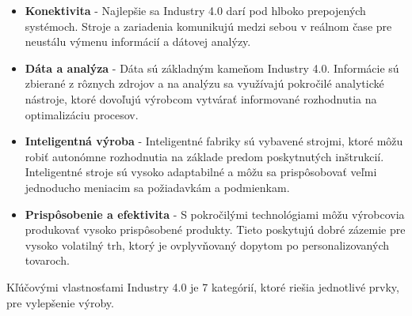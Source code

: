 \begin{itemize}
    \item \textbf{Konektivita} - Najlepšie sa Industry 4.0 darí pod hlboko prepojených systémoch. Stroje a zariadenia komunikujú medzi sebou v reálnom čase pre neustálu výmenu informácií a dátovej analýzy.
    
    \item \textbf{Dáta a analýza} - Dáta sú základným kameňom Industry 4.0. Informácie sú zbierané z rôznych zdrojov a na analýzu sa využívajú pokročilé analytické nástroje, ktoré dovoľujú výrobcom vytvárať informované rozhodnutia na optimalizáciu procesov.
    
    \item \textbf{Inteligentná výroba} - Inteligentné fabriky sú vybavené strojmi, ktoré môžu robiť autonómne rozhodnutia na základe predom poskytnutých inštrukcií. Inteligentné stroje sú vysoko adaptabilné a môžu sa prispôsobovať veľmi jednoducho meniacim sa požiadavkám a podmienkam.
    
    \item \textbf{Prispôsobenie a efektivita} - S pokročilými technológiami môžu výrobcovia produkovať vysoko prispôsobené produkty. Tieto poskytujú dobré zázemie pre vysoko volatilný trh, ktorý je ovplyvňovaný dopytom po personalizovaných tovaroch.
\end{itemize}

Kľúčovými vlastnosťami Industry 4.0 je 7 kategórií, ktoré riešia jednotlivé prvky, pre vylepšenie výroby. 

